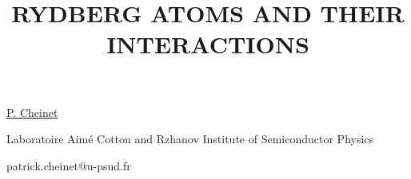\title{RYDBERG ATOMS AND THEIR INTERACTIONS}

\underline{P. Cheinet}  

{\normalsize{\vspace{-4mm}
Laboratoire Aim\'e Cotton and Rzhanov Institute of Semiconductor Physics 



\email patrick.cheinet@u-psud.fr}}


\vspace{\baselineskip}